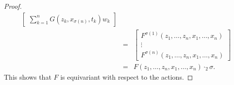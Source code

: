 \documentclass[10pt,a4paper]{amsart}
\begin{document}
\begin{proof}
\begin{eqnarray*}
\begin{bmatrix}
                    \sum_{k=1}^n G(z_k,x_{\sigma(n)},t_k)w_k
               \end{bmatrix}\\
          &=&  \begin{bmatrix}
                    F^{\sigma(1)}(z_1, \ldots, z_n,x_{1}, \ldots, x_{n})\\
                    \vdots\\
                    F^{\sigma(n)}(z_1, \ldots, z_n,x_{1}, \ldots, x_{n})
              \end{bmatrix}\\
          &=&   F(z_1, \ldots, z_n, x_1, \ldots, x_n) \cdot_2 \sigma. 
        \end{eqnarray*}
        This shows that $F$ is equivariant with respect to the actions. 
\end{proof} 
\end{document}

